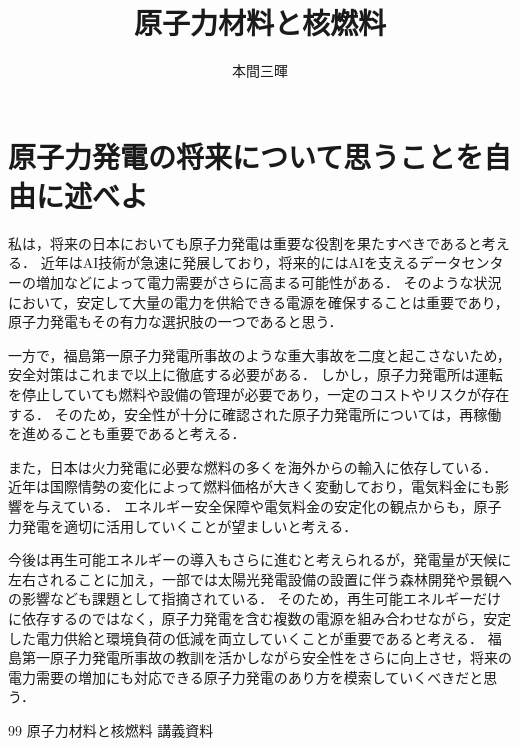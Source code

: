 \documentclass[titlepage,a4paper]{jsarticle}
\title{原子力材料と核燃料}
\author{本間三暉}
\begin{document}
\maketitle
\section{原子力発電の将来について思うことを自由に述べよ}
私は，将来の日本においても原子力発電は重要な役割を果たすべきであると考える．
近年はAI技術が急速に発展しており，将来的にはAIを支えるデータセンターの増加などによって電力需要がさらに高まる可能性がある．
そのような状況において，安定して大量の電力を供給できる電源を確保することは重要であり，原子力発電もその有力な選択肢の一つであると思う．

一方で，福島第一原子力発電所事故のような重大事故を二度と起こさないため，安全対策はこれまで以上に徹底する必要がある．
しかし，原子力発電所は運転を停止していても燃料や設備の管理が必要であり，一定のコストやリスクが存在する．
そのため，安全性が十分に確認された原子力発電所については，再稼働を進めることも重要であると考える．

また，日本は火力発電に必要な燃料の多くを海外からの輸入に依存している．
近年は国際情勢の変化によって燃料価格が大きく変動しており，電気料金にも影響を与えている．
エネルギー安全保障や電気料金の安定化の観点からも，原子力発電を適切に活用していくことが望ましいと考える．

今後は再生可能エネルギーの導入もさらに進むと考えられるが，発電量が天候に左右されることに加え，一部では太陽光発電設備の設置に伴う森林開発や景観への影響なども課題として指摘されている．
そのため，再生可能エネルギーだけに依存するのではなく，原子力発電を含む複数の電源を組み合わせながら，安定した電力供給と環境負荷の低減を両立していくことが重要であると考える．
福島第一原子力発電所事故の教訓を活かしながら安全性をさらに向上させ，将来の電力需要の増加にも対応できる原子力発電のあり方を模索していくべきだと思う．

\begin{thebibliography}{99}
原子力材料と核燃料 講義資料
\end{thebibliography}
\end{document}
